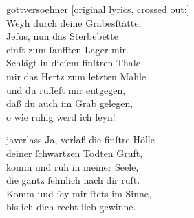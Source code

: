 \documentclass[abbrwidth=6em,tocstyle=ref-genre,shorttitlesize=50]{ees}
\begin{document}
{\begin{movement}{gottversoehner}
  [original lyrics, crossed out:]\\
  Weyh durch deine Grabesſtätte,\\
  Jeſus, nun das Sterbebette\\
  einſt zum ſanfften Lager mir.\\
  Schlägt in dieſem finſtren Thale\\
  mir das Hertz zum letzten Mahle\\
  und du ruffeſt mir entgegen,\\
  daß du auch im Grab gelegen,\\
  o wie ruhig werd ich ſeyn!
\end{movement}

\begin{movement}{javerlass}
  \voice[Coro]
  Ja, verlaß die finſtre Hölle\\
  deiner ſchwartzen Todten Gruft,\\
  komm und ruh in meiner Seele,\\
  die gantz ſehnlich nach dir ruft.\\
  Komm und ſey mir ſtets im Sinne,\\
  bis ich dich recht lieb gewinne.
\end{movement}
}

\eesScore
\end{document}

